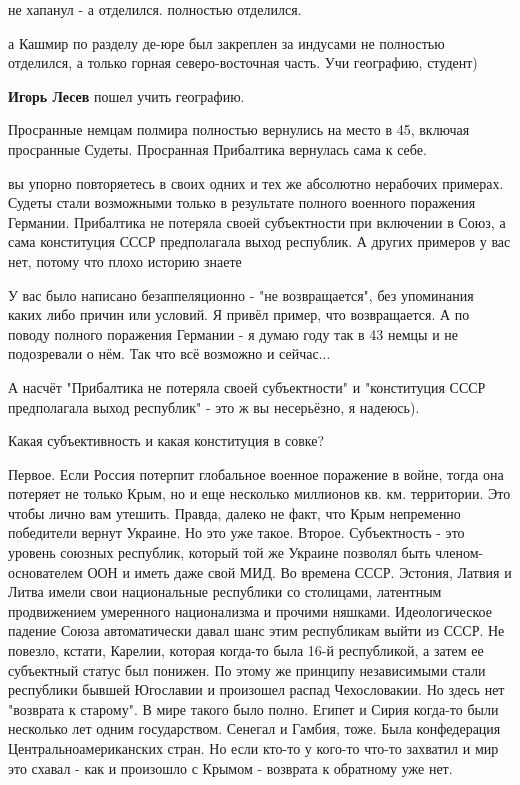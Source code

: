\begin{itemize}
\begin{itemize}
не хапанул - а отделился. полностью отделился.

а Кашмир по разделу де-юре был закреплен за индусами не полностью отделился, а только горная северо-восточная часть. Учи географию, студент)

\textbf{Игорь Лесев} пошел учить географию.
\end{itemize} %


Просранные немцам полмира полностью вернулись на место в 45, включая просранные Судеты.
Просранная Прибалтика вернулась сама к себе.

\begin{itemize} %

вы упорно повторяетесь в своих одних и тех же абсолютно нерабочих примерах.
Судеты стали возможными только в результате полного военного поражения
Германии. Прибалтика не потеряла своей субъектности при включении в Союз, а
сама конституция СССР предполагала выход республик. А других примеров у вас
нет, потому что плохо историю знаете



У вас было написано безаппеляционно - "не возвращается", без упоминания каких
либо причин или условий. Я привёл пример, что возвращается. А по поводу полного
поражения Германии - я думаю году так в 43 немцы и не подозревали о нём. Так
что всё возможно и сейчас...

А насчёт "Прибалтика не потеряла своей субъектности" и "конституция СССР
предполагала выход республик" - это ж вы несерьёзно, я надеюсь).

Какая субъективность и какая конституция в совке?


Первое. Если Россия потерпит глобальное военное поражение в войне, тогда она
потеряет не только Крым, но и еще несколько миллионов кв. км. территории. Это
чтобы лично вам утешить. Правда, далеко не факт, что Крым непременно победители
вернут Украине. Но это уже такое. Второе. Субъектность - это уровень союзных
республик, который той же Украине позволял быть членом-основателем ООН и иметь
даже свой МИД. Во времена СССР. Эстония, Латвия и Литва имели свои национальные
республики со столицами, латентным продвижением умеренного национализма и
прочими няшками. Идеологическое падение Союза автоматически давал шанс этим
республикам выйти из СССР. Не повезло, кстати, Карелии, которая когда-то была
16-й республикой, а затем ее субъектный статус был понижен. По этому же
принципу независимыми стали республики бывшей Югославии и произошел распад
Чехословакии. Но здесь нет "возврата к старому". В мире такого было полно.
Египет и Сирия когда-то были несколько лет одним государством. Сенегал и
Гамбия, тоже. Была конфедерация Центральноамериканских стран. Но если кто-то у
кого-то что-то захватил и мир это схавал - как и произошло с Крымом - возврата
к обратному уже нет.


\end{itemize}
\end{itemize}
